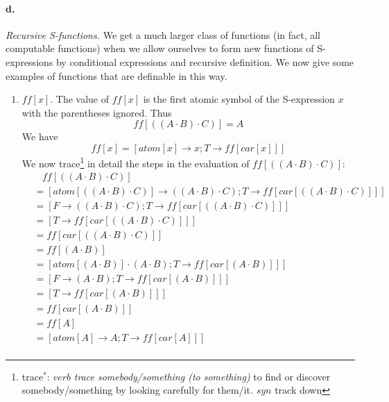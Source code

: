 \documentclass[11pt, a4paper]{article}
\begin{document}
\paragraph{d.}\textit{Recursive S-functions.}
We get a much larger class of functions (in fact, all computable functions) when
we allow ourselves to form new functions of S-expressions by conditional
expressions and recursive definition. We now give some examples of functions
that are definable in this way.
\begin{enumerate}
\item $ff[x]$. The value of $ff[x]$ is the first atomic symbol of the
  S-expression $x$ with the parentheses ignored. Thus
  $$ ff[((A \cdot B) \cdot C)] = A $$
  We have
  $$ ff[x] = [atom[x] \to x; T \to ff[car[x]]] $$
  We now
  trace\footnote{trace$^*$: $verb$ \textit{trace somebody/something (to
      something)} to find or discover somebody/something by looking carefully
    for them/it. $syn$ track down}
  in detail the steps in the evaluation of $ff[((A \cdot B) \cdot
    C)]$:
  \begin{align*}
    &\ \ \ \ ff[((A \cdot B) \cdot C)]                                     \\
    &= [atom[((A \cdot B) \cdot C)] \to ((A \cdot B) \cdot C); T \to ff[car[((A
          \cdot B) \cdot C)]]]                                             \\
    &= [F \to ((A \cdot B) \cdot C); T \to ff[car[((A \cdot B) \cdot C)]]] \\
    &= [T \to ff[car[((A \cdot B) \cdot C)]]]                              \\
    &= ff[car[((A \cdot B) \cdot C)]]                                      \\
    &= ff[(A \cdot B)]                                                     \\
    &= [atom[(A \cdot B)] \cdot (A \cdot B); T \to ff[car[(A \cdot B)]]]   \\
    &= [F \to (A \cdot B); T \to ff[car[(A \cdot B)]]]                     \\
    &= [T \to ff[car[(A \cdot B)]]]                                        \\
    &= ff[car[(A \cdot B)]]                                                \\
    &= ff[A]                                                               \\
    &= [atom[A] \to A; T \to ff[car[A]]]                                   \\

\end{align*}
\end{enumerate}
\end{document}
